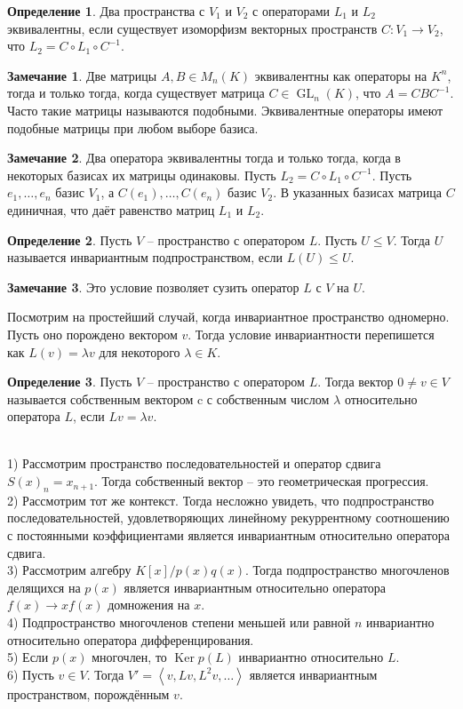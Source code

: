 \documentclass[10pt,a4paper,oneside]{book} %
\theoremstyle{definition}
\newtheorem*{rem}{Замечание}
\newtheorem*{defn}{Определение}
\DeclareMathOperator{\Ker}{Ker}
\newcommand{\GL}{\operatorname{GL}}
\def\exm{\noindent {\bf Примеры:}}
\def\lan{\left\langle }
\def\ran{\right\rangle}
\def\dfn{\begin{defn}}
\def\edfn{\end{defn}}
\def\rm{\begin{rem}}
\def\erm{\end{rem}}
\begin{document}
\dfn Два пространства с $V_1$ и $V_2$ с операторами $L_1$ и $L_2$ эквивалентны, если существует изоморфизм векторных пространств $C \colon V_1 \to V_2$, что $L_2=C \circ L_1 \circ C^{-1}$.
\edfn


\rm Две матрицы $A, B \in M_n(K)$ эквивалентны как операторы на $K^n$, тогда и только тогда, когда существует матрица $C \in \GL_n(K)$, что $A=CBC^{-1}$. Часто такие матрицы называются подобными. Эквивалентные операторы имеют подобные матрицы при любом выборе базиса.
\erm

\rm Два оператора эквивалентны тогда и только тогда, когда в некоторых базисах их матрицы одинаковы.
\proof Пусть $L_2=C \circ L_1 \circ C^{-1}$. Пусть $e_1,\dots,e_n$ базис $V_1$, а $C(e_1),\dots,C(e_n)$ базис $V_2$. В указанных базисах матрица $C$ единичная, что даёт равенство матриц $L_1$ и $L_2$.
\endproof
\erm


\dfn Пусть $V$ -- пространство с оператором $L$. Пусть $U\leq V$. Тогда $U$ называется инвариантным подпространством, если $L(U) \leq U$.
\edfn

\rm Это условие позволяет сузить оператор $L$ с $V$ на $U$.
\erm

Посмотрим на простейший случай, когда инвариантное пространство одномерно. Пусть оно порождено вектором $v$. Тогда условие инвариантности перепишется как $L(v) = \lambda v$ для некоторого $\lambda \in K$.


\dfn Пусть $V$ -- пространство с оператором $L$. Тогда вектор $0\neq v\in V$ называется собственным вектором c с собственным числом $\lambda$ относительно оператора $L$, если $Lv=\lambda v$.
\edfn

\exm \\
1) Рассмотрим пространство  последовательностей и оператор сдвига $S(x)_n= x_{n+1}$. Тогда собственный вектор -- это геометрическая прогрессия.\\
2) Рассмотрим тот же контекст. Тогда несложно увидеть, что подпространство последовательностей, удовлетворяющих линейному рекуррентному соотношению с постоянными коэффициентами является инвариантным относительно оператора сдвига.\\
3) Рассмотрим алгебру $K[x]/p(x)q(x)$. Тогда подпространство многочленов делящихся на $p(x)$ является инвариантным относительно оператора $f(x) \to x f(x)$ домножения на $x$.\\
4) Подпространство многочленов степени меньшей или равной $n$ инвариантно относительно оператора дифференцирования.\\
5) Если $p(x)$ многочлен, то $\Ker p(L)$ инвариантно относительно $L$.\\
6) Пусть $v \in V$. Тогда  $V'=\lan v, Lv, L^2v,\dots \ran$ является инвариантным пространством, порождённым $v$.\\
\end{document}
